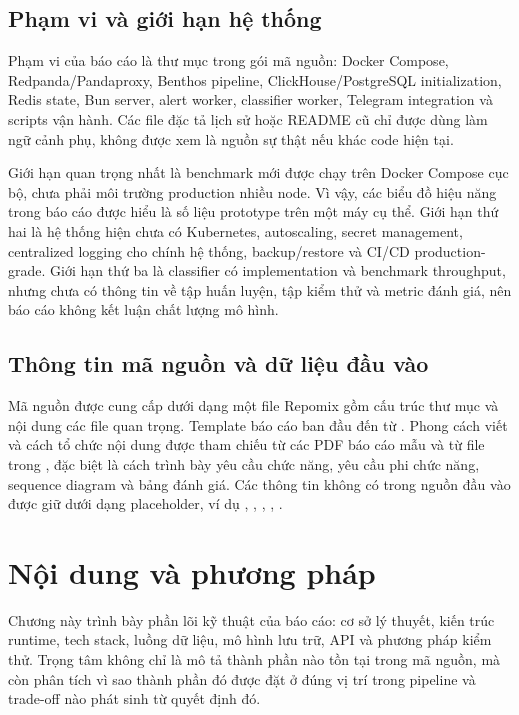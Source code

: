 \section{Phạm vi và giới hạn hệ thống}

Phạm vi của báo cáo là thư mục  trong gói mã nguồn: Docker Compose, Redpanda/Pandaproxy, Benthos pipeline, ClickHouse/PostgreSQL initialization, Redis state, Bun server, alert worker, classifier worker, Telegram integration và scripts vận hành. Các file đặc tả lịch sử hoặc README cũ chỉ được dùng làm ngữ cảnh phụ, không được xem là nguồn sự thật nếu khác code hiện tại.

Giới hạn quan trọng nhất là benchmark mới được chạy trên Docker Compose cục bộ, chưa phải môi trường production nhiều node. Vì vậy, các biểu đồ hiệu năng trong báo cáo được hiểu là số liệu prototype trên một máy cụ thể. Giới hạn thứ hai là hệ thống hiện chưa có Kubernetes, autoscaling, secret management, centralized logging cho chính hệ thống, backup/restore và CI/CD production-grade. Giới hạn thứ ba là classifier có implementation và benchmark throughput, nhưng chưa có thông tin về tập huấn luyện, tập kiểm thử và metric đánh giá, nên báo cáo không kết luận chất lượng mô hình.

\section{Thông tin mã nguồn và dữ liệu đầu vào}

Mã nguồn được cung cấp dưới dạng một file Repomix gồm cấu trúc thư mục và nội dung các file quan trọng. Template báo cáo ban đầu đến từ . Phong cách viết và cách tổ chức nội dung được tham chiếu từ các PDF báo cáo mẫu và từ file  trong , đặc biệt là cách trình bày yêu cầu chức năng, yêu cầu phi chức năng, sequence diagram và bảng đánh giá. Các thông tin không có trong nguồn đầu vào được giữ dưới dạng placeholder, ví dụ , , , , .

\chapter{Nội dung và phương pháp}

Chương này trình bày phần lõi kỹ thuật của báo cáo: cơ sở lý thuyết, kiến trúc runtime, tech stack, luồng dữ liệu, mô hình lưu trữ, API và phương pháp kiểm thử. Trọng tâm không chỉ là mô tả thành phần nào tồn tại trong mã nguồn, mà còn phân tích vì sao thành phần đó được đặt ở đúng vị trí trong pipeline và trade-off nào phát sinh từ quyết định đó.

